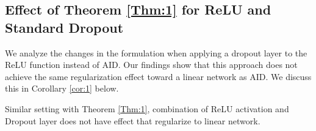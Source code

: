 \subsection{Effect of Theorem \ref{Thm:1} for ReLU and Standard Dropout}
\label{app:cor_1}
We analyze the changes in the formulation when applying a dropout layer to the ReLU function instead of AID.
Our findings show that this approach does not achieve the same regularization effect toward a linear network as AID.
We discuss this in Corollary \ref{cor:1} below.

\begin{corollary}
\label{cor:1}
    Similar setting with Theorem \ref{Thm:1}, combination of ReLU activation and Dropout layer does not have effect that regularize to linear network.
\end{corollary}

